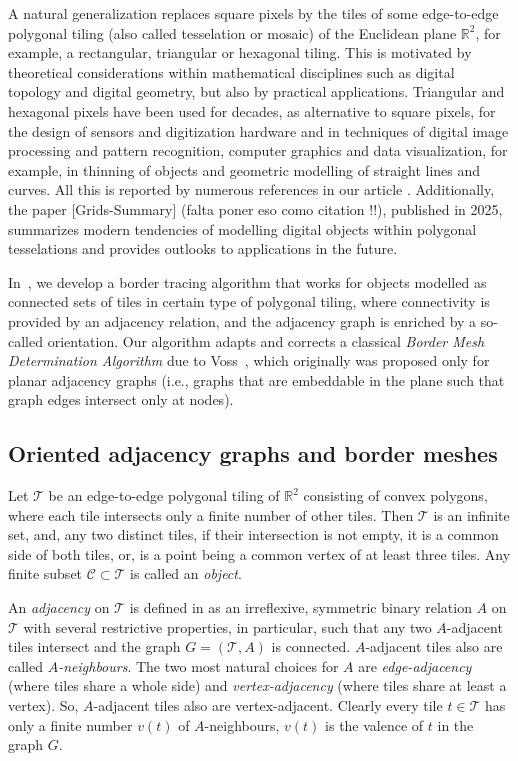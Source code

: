 A natural generalization replaces square pixels by the tiles of some edge-to-edge polygonal
tiling (also called tesselation or mosaic) of the Euclidean plane $\mathbb{R}^2$, for example, a rectangular, triangular or hexagonal tiling. This is motivated by theoretical considerations within mathematical disciplines such as digital topology and digital geometry, but also by practical applications. Triangular and hexagonal pixels have been used for decades, as alternative to square pixels, for the design of sensors and digitization hardware and in techniques of digital image processing and pattern recognition, computer graphics and data visualization, for example, in thinning of objects and geometric modelling of straight lines and curves.
All this is reported by numerous references in our article \cite{WiederholdMatosWiederhold2026}. Additionally, the paper [Grids-Summary] (falta poner eso como citation !!), published in 2025, summarizes modern tendencies of modelling digital objects within polygonal tesselations and provides outlooks to applications in the future.

In~\cite{WiederholdMatosWiederhold2026}, we develop a border tracing algorithm that works for objects modelled as connected sets of tiles in certain type of polygonal tiling, where connectivity is provided by an adjacency relation, and the adjacency graph is enriched by a so-called orientation. Our algorithm adapts and corrects a classical \emph{Border Mesh Determination Algorithm} due to Voss~\cite{voss1993}, which originally was proposed only for planar adjacency graphs (i.e., graphs that are embeddable in the plane such that graph edges intersect only at nodes).


\subsection{Oriented adjacency graphs and border meshes}

Let $\mathcal{T}$ be an edge-to-edge polygonal tiling of $\mathbb{R}^2$ consisting of convex polygons, where each tile intersects only a finite number of other tiles. Then $\mathcal{T}$ is an infinite set, and, any two distinct tiles, if their intersection is not empty, it is a common side of both tiles, or, is a point being a common vertex of at least three tiles. Any finite subset $\mathcal{C} \subset \mathcal{T}$ is called an \emph{object}.

An \emph{adjacency} on $\mathcal{T}$ is defined in \cite{WiederholdMatosWiederhold2026} as an irreflexive, symmetric binary relation $A$ on $\mathcal{T}$ with several restrictive properties, in particular, such that any two $A$-adjacent tiles intersect and the graph $G = (\mathcal{T}, A)$ is connected. $A$-adjacent tiles also are called \emph{$A$-neighbours}. The two most natural choices for $A$ are \emph{edge-adjacency} (where tiles share a whole side) and \emph{vertex-adjacency} (where tiles share at least a vertex). So, $A$-adjacent tiles also are vertex-adjacent. Clearly every tile $t\in \mathcal{T}$ has only a finite number $v(t)$ of $A$-neighbours, $v(t)$ is the valence of $t$ in the graph $G$.

